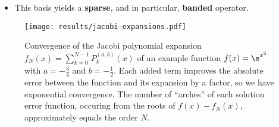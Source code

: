 \begin{itemize}
  \item This basis yields a \textbf{sparse}, and in particular, \textbf{banded} operator.
\end{itemize}

\begin{figure}[H]
  \centering
  \label{fig:jacobi-expansions-error}
  \texttt{[image: results/jacobi-expansions.pdf]}
  \caption[Convergence of Jacobi basis expansion]{Convergence of the Jacobi polynomial expansion $f_N(x) = \sum_{k=0}^{N-1} P_k^{(a, b)}(x)$ of an example function $f(x) = \e^{x^2}$ with $a = -\frac{3}{4}$ and $b = -\frac{1}{2}$. Each added term improves the absolute error between the function and its expansion by a factor, so we have exponential convergence. The number of ``arches'' of each solution error function, occuring from the roots of $f(x) - f_N(x)$, approximately equals the order $N$.}
\end{figure}

